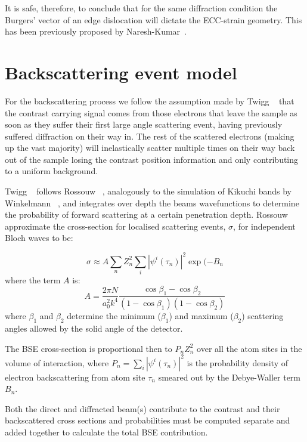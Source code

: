 It is safe, therefore, to conclude that for the same diffraction condition the Burgers' vector of an edge dislocation will dictate the ECC-strain geometry. This has been previously proposed by Naresh-Kumar~\cite{Naresh}.




\section{Backscattering event model}


For the backscattering process we follow the assumption made by Twigg \etal~\cite{Twigg09} that the contrast carrying signal comes from those electrons that leave the sample as soon as they suffer their first large angle scattering event, having previously suffered diffraction on their way in. The rest of the scattered electrons (making up the vast majority) will inelastically scatter multiple times on their way back out of the sample losing the contrast position information and only contributing to a uniform background. 

Twigg \etal~\cite{Twigg09} follows Rossouw \etal~\cite{Rossouw94}, analogously to the simulation of Kikuchi bands by Winkelmann \etal~\cite{Winkelmann07}, and integrates over depth the beams wavefunctions to determine the probability of forward scattering at a certain penetration depth.  Rossouw \etal~\cite{Rossouw94}  approximate the cross-section for localised scattering events, $\sigma$, for independent Bloch waves to be:

\begin{equation}
    \sigma \approx A \sum_n Z_n^2 \sum_i | \psi^i(\tau_n)|^2 \exp{(-B_n}
\end{equation}
where the term $A$ is:
\begin{equation}
    A = \frac{2\pi N}{a_0^2 k^4} \frac{\cos{\beta_1} - \cos{\beta_2}}{(1-\cos{\beta_1})(1-\cos{\beta_2})}
\end{equation}
where $\beta_1$ and $\beta_2$ determine the minimum ($\beta_1$) and maximum ($\beta_2$) scattering angles allowed by the solid angle of the detector.

The BSE cross-section is proportional then to $P_n Z_n^2$ over all the atom sites in the volume of interaction, where $P_n=\sum_i |\psi^i(\tau_n)|^2$ is the probability density of electron backscattering from atom site $\tau_n$ smeared out by the Debye-Waller term $B_n$.


Both the direct and diffracted beam(s) contribute to the contrast and their backscattered cross sections and probabilities must be computed separate and added together to calculate the total BSE contribution.
 





